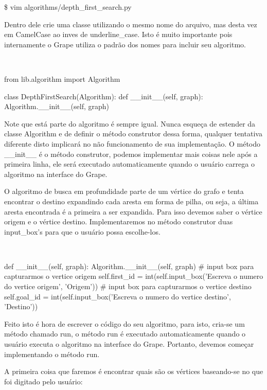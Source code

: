 \documentclass[a4paper]{abnt}
\begin{document}
\$ vim algorithms/depth\_first\_search.py

Dentro dele crie uma classe utilizando o mesmo nome do arquivo, mas desta vez em CamelCase ao inves de underline\_case. Isto é muito importante pois internamente o Grape utiliza o padrão dos nomes para incluir seu algoritmo.

\\
\begin{python}
from lib.algorithm import Algorithm

class DepthFirstSearch(Algorithm):
    def __init__(self, graph):
         Algorithm.__init__(self, graph)
\end{python}

    Note que está parte do algoritmo é sempre igual. Nunca esqueça de estender da classe Algorithm e de definir o método construtor dessa forma, qualquer tentativa diferente disto implicará no não funcionamento de sua implementação. O método \_\_init\_\_  é o método construtor, podemos implementar mais coisas nele após a primeira linha, ele será executado automaticamente quando o usuário carrega o algoritmo na interface do Grape.

    O algoritmo de busca em profundidade parte de um vértice do grafo e tenta encontrar o destino expandindo cada aresta em forma de pilha, ou seja, a última aresta encontrada é a primeira a ser expandida. Para isso devemos saber o vértice origem e o vértice destino. Implementaremos no método construtor duas input\_box’s para que o usuário possa escolhe-los.

\\
\begin{python}
def __init__(self, graph):
        Algorithm.__init__(self, graph)
        # input box para capturarmos o vertice origem
        self.first_id = int(self.input_box('Escreva o numero do vertice origem', 'Origem'))
        # input box para capturarmos o vertice destino
        self.goal_id = int(self.input_box('Escreva o numero do vertice destino', 'Destino'))
\end{python}

Feito isto é hora de escrever o código do seu algoritmo, para isto, cria-se um método chamado run, o método run é executado automaticamente quando o usuário executa o algoritmo na interface do Grape. Portanto, devemos começar implementando o método run.

A primeira coisa que faremos é encontrar quais são os vértices baseando-se no que foi digitado pelo usuário:
\end{document}
